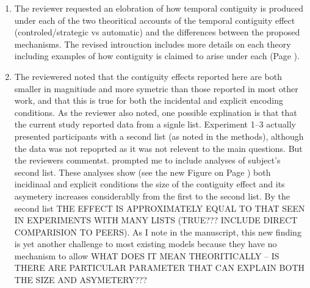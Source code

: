 \documentclass[12pt]{article}
\begin{document}
\begin{enumerate}

\item 
	The reviewer requested an elobration of how temporal contiguity is produced under each of the two theoritical accounts of the temporal contiguity effect (controled/strategic vs automatic) and the differences between the proposed mechanisms. The revised introuction includes more details on each theory including examples of how contiguity is claimed to arise under each (Page \pageref{TODO-2}). 

\item
	The reviewered noted that the contiguity effects reported here are both smaller in magnitiude and more symetric than those reported in most other work, and that this is true for both the incidental and explicit encoding conditions. As the reviewer also noted, one possible explination is that that the current study reported data from a signle list. Experiment 1--3 actually presented participants with a second list (as noted in the methods), although the data was not repoprted as it was not relevent to the main questions. But the reviewers commentst. prompted me to include analyses of subject's second list. These analyses show (see the new Figure on Page \pageref{TODO-6}) both incidinaal and explicit conditions the size of the contiguity effect and its asymetery increases considerablly from the first to the second list. By the second list THE EFFECT IS APPROXIMATELY EQUAL TO THAT SEEN IN EXPERIMENTS WITH MANY LISTS (TRUE??? INCLUDE DIRECT COMPARISION TO PEERS). As I note in the manuscript, this new finding is yet another challenge to most existing models because they have no mechanism to allow WHAT DOES IT MEAN THEORITICALLY -- IS THERE ARE PARTICULAR PARAMETER THAT CAN EXPLAIN BOTH THE SIZE AND ASYMETERY??? 


\end{enumerate}
\end{document}
